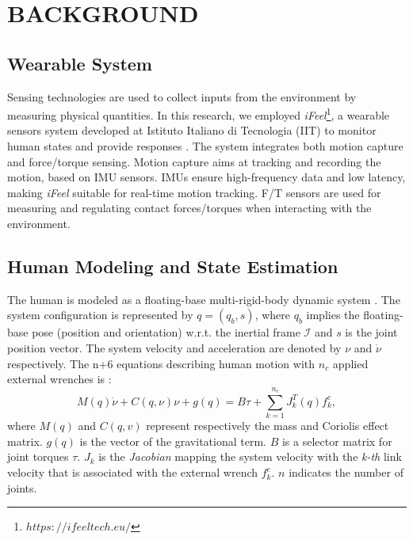 
\section{BACKGROUND}
\label{sec:background}
\subsection{Wearable System}
Sensing technologies are used to collect inputs from the environment by measuring physical quantities. In this research, we employed \emph{iFeel}\footnote{\href{https://ifeeltech.eu/}{$https://ifeeltech.eu/$}}, a wearable sensors system developed at Istituto Italiano di Tecnologia (IIT) to monitor human states and provide responses \cite{sortino2023}. The system integrates both motion capture and force/torque sensing. Motion capture aims at tracking and recording the motion, based on IMU sensors. IMUs ensure high-frequency data and low latency, making \emph{iFeel} suitable for real-time motion tracking. F/T sensors are used for measuring and regulating contact forces/torques when interacting with the environment. 

\subsection{Human Modeling and State Estimation}
\label{sec:human_modeling_estimation}
The human is modeled as a floating-base multi-rigid-body dynamic system \cite{Latella2019}. The system configuration is represented by $q = (q_b, s)$, where $q_b$ implies the floating-base pose (position and orientation) w.r.t. the inertial frame $\mathcal{I}$ and $s$ is the joint position vector. The system velocity and acceleration are denoted by ${\nu}$ and $\dot{\nu}$ respectively. The n+6 equations describing human motion with $n_c$ applied external wrenches is \cite{Kourosh2022}:
\begin{equation}\label{human_dynamics}
    M(q)\dot{\nu} + C(q, \nu)\nu + g(q) = B\tau + \displaystyle\sum_{k=1}^{n_c} {J_{k}^{T}(q) f_{k}^{c}},
\end{equation}
where $M(q)$ and $C(q, v)$ represent respectively the mass and Coriolis effect matrix. $g(q)$ is the vector of the gravitational term. $B$ is a selector matrix for joint torques $\tau$. $J_{k}$ is the \emph{Jacobian} mapping the system velocity with the \emph{k-th} link velocity that is associated with the external wrench $f_{k}^{c}$. $n$ indicates the number of joints.

